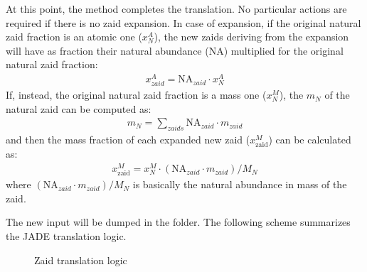 \documentclass[letterpaper,10pt,english]{sphinxmanual}
\let\sphinxpxdimen\pdfpxdimen\else\newdimen\sphinxpxdimen
\begin{document}
At this point, the  method completes the translation. No particular actions
are required if there is no zaid expansion.
In case of expansion, if the original natural zaid fraction is an atomic one
(\(x^A_N\)), the new zaids deriving from the expansion will have as fraction their
natural abundance (NA) multiplied for the original natural zaid fraction:
\begin{equation*}
\begin{split}x^A_{zaid} = \text{NA}_{zaid}\cdot x^A_N\end{split}
\end{equation*}
If, instead, the original natural zaid fraction is a mass one (\(x^M_N\)),
the  \(m_N\) of the natural zaid can be computed as:
\begin{equation*}
\begin{split}m_N = \sum_{zaids} \text{NA}_{zaid}\cdot m_{zaid}\end{split}
\end{equation*}
and then the mass fraction of each expanded new zaid (\(x^M_\text{zaid}\))
can be calculated as:
\begin{equation*}
\begin{split}x^M_\text{zaid}=x^M_N\cdot (\text{NA}_{zaid}\cdot m_{zaid})/M_N\end{split}
\end{equation*}
where \((\text{NA}_{zaid}\cdot m_{zaid})/M_N\)
is basically the natural abundance in mass of the zaid.

The new input will be dumped in the
 folder.
The following scheme summarizes the JADE translation logic.

\begin{figure}[htbp]
\centering
\capstart

\noindent\sphinxincludegraphics[width=600\sphinxpxdimen]{{Translation_logic}.jpg}
\caption{Zaid translation logic}\label{\detokenize{usage/utilities:id2}}\end{figure}
\end{document}
